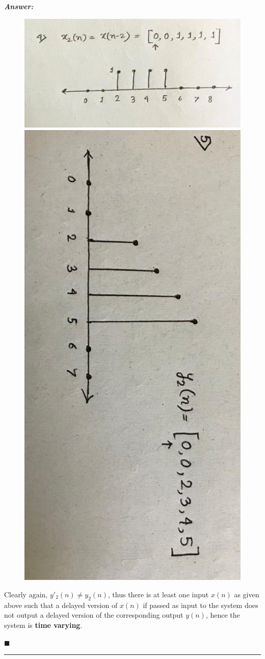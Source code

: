 \documentclass[12pt]{article}
\theoremstyle{definition}
\newenvironment{answer}{
    \textbf{\textit{Answer:}} \qquad
}{\hfill $\blacksquare$ \\ \begin{center}
    \rule{0.6\linewidth}{0.5px}    
\end{center}
}
\begin{document}
\begin{answer}
\begin{enumerate}
        \begin{figure}[H]
            \centering
            \includegraphics[width = 0.6\linewidth]{q10_d_4.jpeg}
            \includegraphics[height = 0.6\linewidth, angle = 90]{q10_d_5.jpeg}
        \end{figure}

        Clearly again, $y'_2(n) \neq y_2(n)$, thus there is at least one input $x(n)$ as given above such that a delayed version of $x(n)$ if passed as input to the system does not output a delayed version of the corresponding output $y(n)$, hence the system is \textbf{time varying}.
    \end{enumerate}    
\end{answer}
\end{document}
